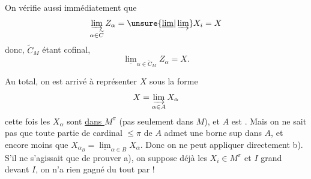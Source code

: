 On vérifie aussi immédiatement que
\[
\varinjlim_{\alpha\in\widetilde C}Z_\alpha=\unsure{\underline{\lim}|\varinjlim}X_i=X
\]
donc, $\widetilde C_M$ étant cofinal,
\[
\underline{\lim}_{\alpha\in\widetilde C_M}Z_\alpha=X.
\]

Au total, on est arrivé à représenter $X$ sous la forme
\[
X=\varinjlim_{\alpha\in A}X_\alpha
\]
cette fois les $X_\alpha$ sont \uline{dans $M^{\pi}$} (pas seulement dans $M$), et $A$ est  .  Mais on ne sait pas que  toute partie  de cardinal $\leq\pi$ de $A$ admet une borne sup  dans $A$, et encore moins que $X_{\alpha_B}=\underline{\lim}_{\alpha\in B}X_\alpha$. Donc on ne peut  appliquer directement b). S'il ne s'agissait que de prouver  a),  on suppose déjà les $X_i\in M^{\pi}$ et $I$ grand devant $I$, on n'a rien gagné du tout par  !
